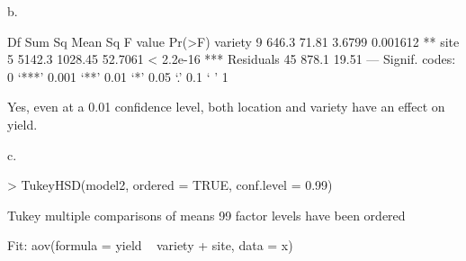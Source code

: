 \documentclass[11pt,letterpaper]{article}
\begin{document}
\begin{enumerate}
b.
\begin{Schunk}
\begin{Soutput}
            Df Sum Sq Mean Sq F value    Pr(>F)    
variety      9  646.3   71.81  3.6799  0.001612 ** 
site         5 5142.3 1028.45 52.7061 < 2.2e-16 ***
Residuals   45  878.1   19.51                      
---
Signif. codes:  0 ‘***’ 0.001 ‘**’ 0.01 ‘*’ 0.05 ‘.’ 0.1 ‘ ’ 1 
\end{Soutput}
\end{Schunk}

Yes, even at a 0.01 confidence level, both location and variety have an effect on yield.

c. 
\begin{Schunk}
\begin{Sinput}
> TukeyHSD(model2, ordered = TRUE, conf.level = 0.99)
\end{Sinput}
\begin{Soutput}
  Tukey multiple comparisons of means
    99% family-wise confidence level
    factor levels have been ordered

Fit: aov(formula = yield ~ variety + site, data = x)


\end{Soutput}
\end{Schunk}
\end{enumerate}
\end{document}
